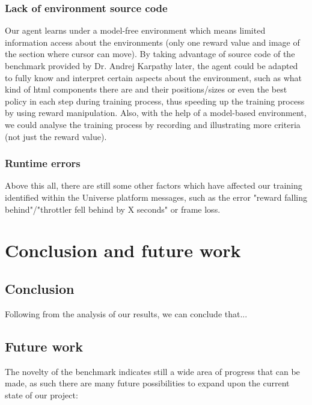 \documentclass[10pt,journal,compsoc]{IEEEtran}
\begin{document}
\subsubsection{Lack of environment source code}
Our agent learns under a model-free environment which means limited information access about the environments (only one reward value and image of the section where cursor can move). By taking advantage of source code of the benchmark provided by Dr. Andrej Karpathy later, the agent could be adapted to fully know and interpret certain aspects about the environment, such as what kind of html components there are and their positions/sizes or even the best policy in each step during training process, thus speeding up the training process by using reward manipulation. Also, with the help of a model-based environment, we could analyse the training process by recording and illustrating more criteria (not just the reward value). 

\subsubsection{Runtime errors}
Above this all, there are still some other factors which have affected our training identified within the Universe platform messages, such as the error "reward falling behind"/"throttler fell behind by X seconds" or frame loss.




\section{Conclusion and future work}
\subsection{Conclusion}
Following from the analysis of our results, we can conclude that...
\subsection{Future work}
The novelty of the benchmark indicates still a wide area of progress that can be made, as such there are many future possibilities to expand upon the current state of our project:
\end{document}
